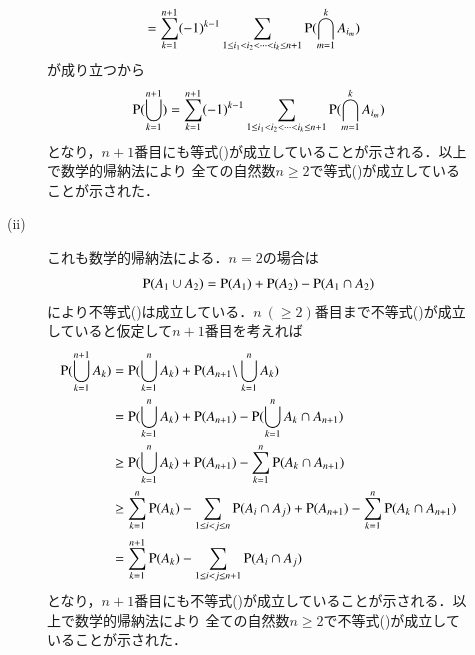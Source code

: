 \begin{description}
\begin{description}
\begin{align}
				&=\sum_{k=1}^{n+1}(-1)^{k-1} \sum_{1 \leq i_1 < i_2 < \cdots < i_k \leq n+1} \operatorname{P} (\bigcap_{m=1}^{k}A_{i_m})
			\end{align}
			が成り立つから
			\begin{align}
				\operatorname{P} (\bigcup_{k=1}^{n+1}) = \sum_{k=1}^{n+1}(-1)^{k-1} \sum_{1 \leq i_1 < i_2 < \cdots < i_k \leq n+1} \operatorname{P} (\bigcap_{m=1}^{k}A_{i_m})
			\end{align}
			となり，$n+1$番目にも等式()が成立していることが示される．以上で数学的帰納法により
			全ての自然数$n \geq 2$で等式()が成立していることが示された．
		\item[\rm{(ii)}] これも数学的帰納法による．$n=2$の場合は
			\begin{align}
				\operatorname{P} (A_1 \cup A_2) = \operatorname{P} (A_1) + \operatorname{P} (A_2) - \operatorname{P} (A_1 \cap A_2)
			\end{align}
			により不等式()は成立している．$n\ (\geq 2)$番目まで不等式()が成立していると仮定して$n+1$番目を考えれば
			\begin{align}
				\operatorname{P} (\bigcup_{k=1}^{n+1} A_k) 
				&= \operatorname{P} (\bigcup_{k=1}^{n} A_k) + \operatorname{P} (A_{n+1} \backslash \bigcup_{k=1}^{n} A_k) \\
				&= \operatorname{P} (\bigcup_{k=1}^{n} A_k) + \operatorname{P} (A_{n+1}) - \operatorname{P} (\bigcup_{k=1}^{n} A_k \cap A_{n+1}) \\
				&\geq \operatorname{P} (\bigcup_{k=1}^{n} A_k) + \operatorname{P} (A_{n+1}) - \sum_{k=1}^{n} \operatorname{P} (A_k \cap A_{n+1}) \\
				&\geq \sum_{k=1}^{n} \operatorname{P} (A_k) - \sum_{1 \leq i < j \leq n} \operatorname{P} (A_i \cap A_j) + \operatorname{P} (A_{n+1}) - \sum_{k=1}^{n} \operatorname{P} (A_k \cap A_{n+1}) \\
				&= \sum_{k=1}^{n+1} \operatorname{P} (A_k) - \sum_{1 \leq i < j \leq n+1} \operatorname{P} (A_i \cap A_j) 
			\end{align}
			となり，$n+1$番目にも不等式()が成立していることが示される．以上で数学的帰納法により
			全ての自然数$n \geq 2$で不等式()が成立していることが示された．
			\QED
	\end{description}
\end{description}

